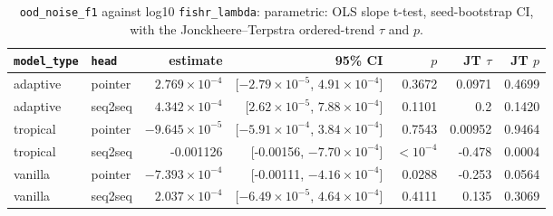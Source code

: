 \documentclass[10pt]{article}
\begin{document}
{\small
\begin{longtable}{llrrrrr}
\caption{\texttt{ood\_noise\_f1} against log10 \texttt{fishr\_lambda}: parametric: OLS slope t-test, seed-bootstrap CI, with the Jonckheere--Terpstra ordered-trend $\tau$ and $p$.}\label{tab:trend-ood_noise_f1}\\
\toprule
\texttt{model\_type} & \texttt{head} & estimate & 95\% CI & $p$ & JT $\tau$ & JT $p$\\
\midrule
\endhead
adaptive & pointer & $2.769\times10^{-4}$ & [$-2.79\times10^{-5}$, $4.91\times10^{-4}$] & 0.3672 & 0.0971 & 0.4699\\
adaptive & seq2seq & $4.342\times10^{-4}$ & [$2.62\times10^{-5}$, $7.88\times10^{-4}$] & 0.1101 & 0.2 & 0.1420\\
tropical & pointer & $-9.645\times10^{-5}$ & [$-5.91\times10^{-4}$, $3.84\times10^{-4}$] & 0.7543 & 0.00952 & 0.9464\\
tropical & seq2seq & -0.001126 & [-0.00156, $-7.70\times10^{-4}$] & $<10^{-4}$ & -0.478 & 0.0004\\
vanilla & pointer & $-7.393\times10^{-4}$ & [-0.00111, $-4.16\times10^{-4}$] & 0.0288 & -0.253 & 0.0564\\
vanilla & seq2seq & $2.037\times10^{-4}$ & [$-6.49\times10^{-5}$, $4.64\times10^{-4}$] & 0.4111 & 0.135 & 0.3069\\
\bottomrule
\end{longtable}
}
\end{document}
